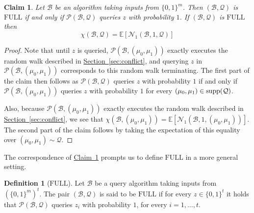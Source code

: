 \documentclass[11pt]{article}
\numberwithin{equation}{section}
\newtheorem{claim}[theorem]{Claim}
\theoremstyle{definition}
\newtheorem{definition}[theorem]{Definition}
\theoremstyle{plain}
\newcommand{\expref}[2]{\hyperref[#2]{#1~\ref{#2}}}
\newcommand{\full}{\text{FULL}}
\newcommand\supp{\mathop{\rm supp}}
\newcommand{\clB}{\mathcal{B}}
\newcommand{\clQ}{\mathcal{Q}}
\newcommand{\clP}{\mathcal{P}}
\newcommand{\clN}{\mathcal{N}}
\newcommand{\E}{\mathbb{E}}
\begin{document}
\begin{claim}
\label{clm:full}
Let $\clB$ be an algorithm taking inputs from $\{0,1\}^m$.  Then
$(\clB, \clQ)$ is $\full$ if and only if $\clP(\clB, \clQ)$ queries $z$ with probability $1$.  If $(\clB, \clQ)$ is $\full$ then 
\[
\chi(\clB, \clQ) = \E[\clN_1(\clB,1, \clQ)]
\]
\end{claim}

\begin{proof}
Note that until $z$ is queried, $\clP(\clB, (\mu_0,\mu_1))$ exactly executes the random walk described in \expref{Section}{sec:conflict}, and querying $z$ in 
$\clP(\clB, (\mu_0,\mu_1))$ corresponds to this random walk terminating.  The first part of the claim then follows as $\clP(\clB, \clQ)$ queries $z$ with probability $1$ 
if and only if $\clP(\clB, (\mu_0, \mu_1))$ queries $z$ with probability $1$ for every $(\mu_0, \mu_1) \in \supp(\clQ)$. 

Also, because $\clP(\clB, (\mu_0,\mu_1))$ exactly executes the random walk described in \expref{Section}{sec:conflict}, we see that 
$\chi(\clB, (\mu_0, \mu_1)) = \E[\clN_1(\clB,1, (\mu_0, \mu_1))]$.  The second part of the claim follows by taking the expectation of this 
equality over $(\mu_0, \mu_1) \sim \clQ$.
\end{proof}

The correspondence of \expref{Claim}{clm:full} prompts us to define $\full$ in a more general setting.
\begin{definition}[$\full$]
Let $\clB$ be a query algorithm taking inputs from $(\{0,1\}^m)^t$.
The pair $(\clB, \clQ)$ is said to be $\full$ if for every $z \in \{0,1\}^t$ it holds that $\clP (\clB, \clQ)$ queries $z_i$ with probability $1$, for every $i=1, \ldots, t$.
\end{definition}
\end{document}
